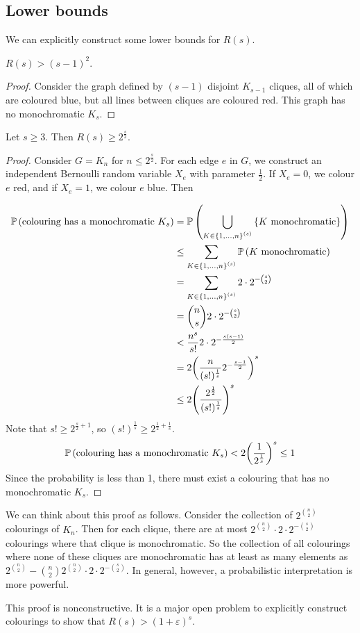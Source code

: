 \subsection{Lower bounds}
We can explicitly construct some lower bounds for \( R(s) \).
\begin{proposition}
	\( R(s) > (s-1)^2 \).
\end{proposition}
\begin{proof}
	Consider the graph defined by \( (s-1) \) disjoint \( K_{s-1} \) cliques, all of which are coloured blue, but all lines between cliques are coloured red.
	This graph has no monochromatic \( K_s \).
\end{proof}
\begin{theorem}[Erd\H{o}s]
	Let \( s \geq 3 \).
	Then \( R(s) \geq 2^{\frac s2} \).
\end{theorem}
\begin{proof}
	Consider \( G = K_n \) for \( n \leq 2^{\frac s 2} \).
	For each edge \( e \) in \( G \), we construct an independent Bernoulli random variable \( X_e \) with parameter \( \frac 12 \).
	If \( X_e = 0 \), we colour \( e \) red, and if \( X_e = 1 \), we colour \( e \) blue.
	Then
	
	\begin{align*}
		\mathbb{P}\left({\text{colouring has a monochromatic } K_s}\right) &= \mathbb{P}\left({\bigcup_{K \in \qty{1, \dots, n}^{(s)}} \qty{K \text{ monochromatic}}}\right) \\
		&\leq \sum_{K \in \qty{1, \dots, n}^{(s)}} \mathbb{P}\left({K \text{ monochromatic}}\right) \\
		&= \sum_{K \in \qty{1, \dots, n}^{(s)}} 2 \cdot 2^{-\binom s 2} \\
		&= \binom n s 2 \cdot 2^{-\binom s 2} \\
		&< \frac{n^s}{s!} 2 \cdot 2^{-\frac{s(s-1)}{2}} \\
		&= 2 \qty(\frac{n}{(s!)^{\frac 1s}} 2^{-\frac{s-1}{2}})^s \\
		&\leq 2 \qty( \frac{2^{\frac 12}}{(s!)^{\frac 1s}} )^s
	\end{align*}
	Note that \( s! \geq 2^{\frac s 2 + 1} \), so \( (s!)^{\frac 1s} \geq 2^{\frac 12 + \frac 1s} \).
	\[ \mathbb{P}\left({\text{colouring has a monochromatic } K_s}\right) < 2 \qty(\frac{1}{2^{\frac 1s}})^s \leq 1 \]
	Since the probability is less than 1, there must exist a colouring that has no monochromatic \( K_s \).
\end{proof}
\begin{remark}
	We can think about this proof as follows.
	Consider the collection of \( 2^{\binom n 2} \) colourings of \( K_n \).
	Then for each clique, there are at most \( 2^{\binom n 2} \cdot 2 \cdot 2^{-\binom s 2} \) colourings where that clique is monochromatic.
	So the collection of all colourings where none of these cliques are monochromatic has at least as many elements as \( 2^{\binom n 2} - \binom n 2 2^{\binom n 2} \cdot 2 \cdot 2^{-\binom s 2} \).
	In general, however, a probabilistic interpretation is more powerful.
\end{remark}
\begin{remark}
	This proof is nonconstructive.
	It is a major open problem to explicitly construct colourings to show that \( R(s) > (1 + \varepsilon)^s \).
\end{remark}
